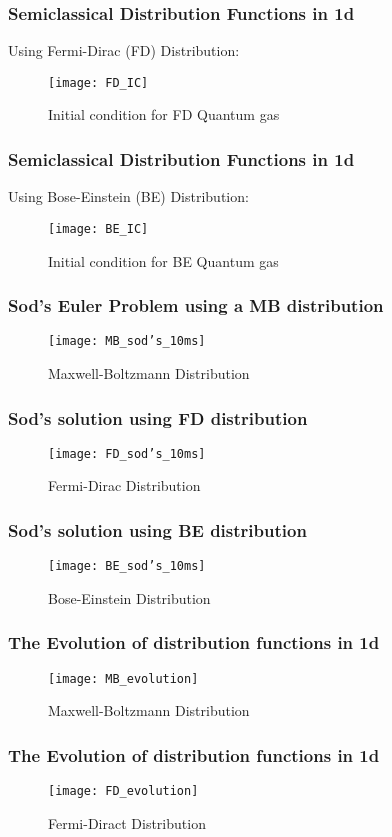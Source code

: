 \begin{frame}
	\frametitle{Semiclassical Distribution Functions in 1d}
	Using Fermi-Dirac (FD) Distribution:
	\begin{figure}[p2]
	\centering
	\texttt{[image: FD\_IC]}%
	\caption{Initial condition for FD Quantum gas}
	\end{figure}
\end{frame}

\begin{frame}
	\frametitle{Semiclassical Distribution Functions in 1d}
	Using Bose-Einstein (BE) Distribution:
	\begin{figure}[p3]
	\centering
	\texttt{[image: BE\_IC]}%
	\caption{Initial condition for BE Quantum gas}
	\end{figure}
\end{frame}

\begin{frame}
	\frametitle{Sod's Euler Problem using a MB distribution}
	\begin{figure}[p4]
	\centering
	\texttt{[image: MB\_sod's\_10ms]}%
	\caption{Maxwell-Boltzmann Distribution}
	\end{figure}
\end{frame}

\begin{frame}
	\frametitle{Sod's solution using FD distribution}
	\begin{figure}[p5]
	\centering
	\texttt{[image: FD\_sod's\_10ms]}%
	\caption{Fermi-Dirac Distribution}
	\end{figure}
\end{frame}

\begin{frame}
	\frametitle{Sod's solution using BE distribution}
	\begin{figure}[p6]
	\centering
	\texttt{[image: BE\_sod's\_10ms]}%
	\caption{Bose-Einstein Distribution}
	\end{figure}
\end{frame}

\begin{frame}
	\frametitle{The Evolution of distribution functions in 1d}
	\begin{figure}[p7]
	\centering
	\texttt{[image: MB\_evolution]}%
	\caption{Maxwell-Boltzmann Distribution}
	\end{figure}
\end{frame}

\begin{frame}
	\frametitle{The Evolution of distribution functions in 1d}
	\begin{figure}[p8]
	\centering
	\texttt{[image: FD\_evolution]}%
	\caption{Fermi-Diract Distribution}
	\end{figure}
\end{frame}

